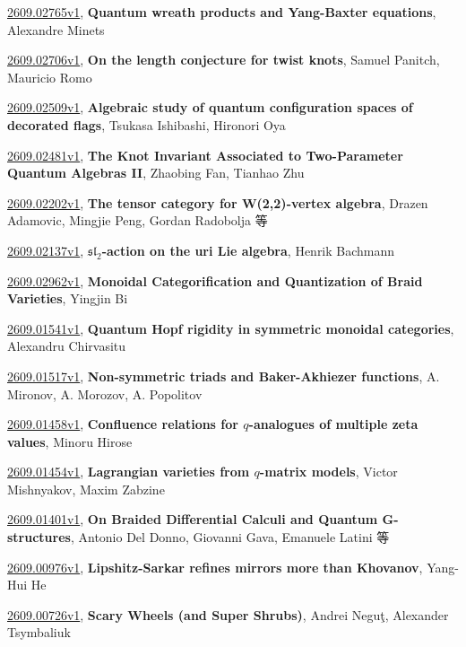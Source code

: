 \documentclass[9pt, a4paper]{article}
\theoremstyle{plain}
\theoremstyle{definition}
\theoremstyle{remark}
\newcommand{\arxiv}[3]{\href{https://arxiv.org/abs/#1}{#1}, \textbf{\textcolor{arxivblue}{#2}}, #3}
\begin{document}
\arxiv{2609.02765v1}{Quantum wreath products and Yang-Baxter equations}{Alexandre Minets}

\arxiv{2609.02706v1}{On the length conjecture for twist knots}{Samuel Panitch, Mauricio Romo}

\arxiv{2609.02509v1}{Algebraic study of quantum configuration spaces of decorated flags}{Tsukasa Ishibashi, Hironori Oya}

\arxiv{2609.02481v1}{The Knot Invariant Associated to Two-Parameter Quantum Algebras II}{Zhaobing Fan, Tianhao Zhu}

\arxiv{2609.02202v1}{The tensor category for W(2,2)-vertex algebra}{Drazen Adamovic, Mingjie Peng, Gordan Radobolja 等}

\arxiv{2609.02137v1}{$\mathfrak{sl}_2$-action on the uri Lie algebra}{Henrik Bachmann}

\arxiv{2609.02962v1}{Monoidal Categorification and Quantization of Braid Varieties}{Yingjin Bi}

\arxiv{2609.01541v1}{Quantum Hopf rigidity in symmetric monoidal categories}{Alexandru Chirvasitu}

\arxiv{2609.01517v1}{Non-symmetric triads and Baker-Akhiezer functions}{A. Mironov, A. Morozov, A. Popolitov}

\arxiv{2609.01458v1}{Confluence relations for $q$-analogues of multiple zeta values}{Minoru Hirose}

\arxiv{2609.01454v1}{Lagrangian varieties from $q$-matrix models}{Victor Mishnyakov, Maxim Zabzine}

\arxiv{2609.01401v1}{On Braided Differential Calculi and Quantum G-structures}{Antonio Del Donno, Giovanni Gava, Emanuele Latini 等}

\arxiv{2609.00976v1}{Lipshitz-Sarkar refines mirrors more than Khovanov}{Yang-Hui He}

\arxiv{2609.00726v1}{Scary Wheels (and Super Shrubs)}{Andrei Neguţ, Alexander Tsymbaliuk}

\end{document}
